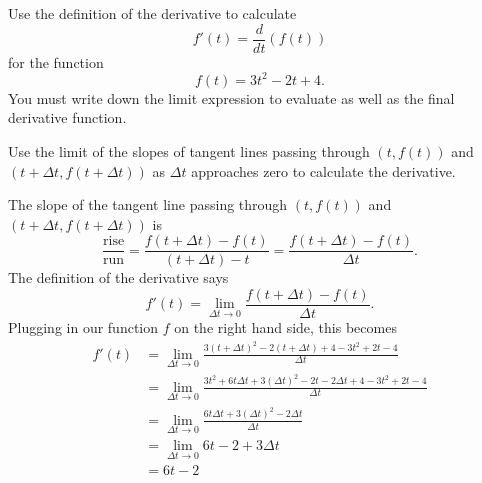 \documentclass{ximera}
\author{Emma Smith Zbarsky}
\begin{document}
\begin{exercise}

Use the definition of the derivative to calculate
\[f'(t) = \frac{d}{dt}(f(t))\] for the function \[f(t) = 3t^2-2t+4.\]
You must write down the limit expression to evaluate as well as the
final derivative function.


\begin{hint}
Use the limit of the slopes of tangent lines passing through $(t,f(t))$
and $(t+\Delta t,f(t+\Delta t))$ as $\Delta t$ approaches zero to
calculate the derivative.
\end{hint}


\begin{hint}
The slope of the tangent line passing through $(t,f(t))$ and
$(t+\Delta t, f(t+\Delta t))$ is
\[\frac{\mbox{rise}}{\mbox{run}} = \frac{f(t+\Delta t) - f(t)}{(t+\Delta t)-t} = \frac{f(t+\Delta t)-f(t)}{\Delta t}.\]
The definition of the derivative says
\[f'(t) = \lim_{\Delta t \to 0} \frac{f(t+\Delta t)-f(t)}{\Delta t}.\]
Plugging in our function $f$ on the right hand side, this becomes
\begin{align*} f'(t) &= \lim_{\Delta t \to 0} \frac{3(t+\Delta t)^2-2(t+\Delta t)+4-3t^2+2t-4}{\Delta t} \\
&= \lim_{\Delta t \to 0} \frac{3t^2+6t\Delta t+3(\Delta t)^2-2t-2\Delta t+4-3t^2+2t-4}{\Delta t} \\
&= \lim_{\Delta t \to 0} \frac{6t\Delta t+3(\Delta t)^2-2\Delta t}{\Delta t} \\
&= \lim_{\Delta t \to 0} 6t-2 + 3\Delta t \\
&= \boxed{6t-2}
\end{align*}
\end{hint}


\begin{multipleChoice}
\end{multipleChoice}

\end{exercise}
\end{document}
